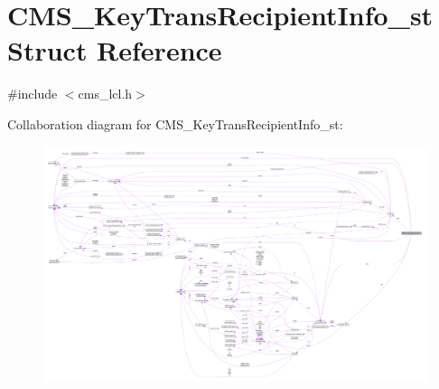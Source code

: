 \hypertarget{struct_c_m_s___key_trans_recipient_info__st}{}\section{C\+M\+S\+\_\+\+Key\+Trans\+Recipient\+Info\+\_\+st Struct Reference}
\label{struct_c_m_s___key_trans_recipient_info__st}


{\ttfamily \#include $<$cms\+\_\+lcl.\+h$>$}



Collaboration diagram for C\+M\+S\+\_\+\+Key\+Trans\+Recipient\+Info\+\_\+st\+:\nopagebreak
\begin{figure}[H]
\begin{center}
\leavevmode
\includegraphics[width=350pt]{struct_c_m_s___key_trans_recipient_info__st__coll__graph}
\end{center}
\end{figure}
